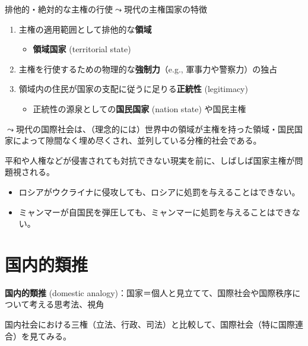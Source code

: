 \documentclass[
  xelatex,
  ja=standard]{bxjsarticle}
\providecommand{\tightlist}{%
  \setlength{\itemsep}{0pt}\setlength{\parskip}{0pt}}\usepackage{longtable,booktabs,array}
\begin{document}
排他的・絶対的な主権の行使\(\leadsto\)現代の主権国家の特徴
\citep{sunahara2020}

\begin{enumerate}
\def\labelenumi{\arabic{enumi}.}
\tightlist
\item
  主権の適用範囲として排他的な\textbf{領域}

  \begin{itemize}
  \tightlist
  \item
    \textbf{領域国家} (territorial state)
  \end{itemize}
\item
  主権を行使するための物理的な\textbf{強制力}（e.g.,
  軍事力や警察力）の独占
\item
  領域内の住民が国家の支配に従うに足りる\textbf{正統性} (legitimacy)

  \begin{itemize}
  \tightlist
  \item
    正統性の源泉としての\textbf{国民国家} (nation state) や国民主権
  \end{itemize}
\end{enumerate}

\(\leadsto\)現代の国際社会は、（理念的には）世界中の領域が主権を持った領域・国民国家によって隙間なく埋め尽くされ、並列している分権的社会である。

平和や人権などが侵害されても対抗できない現実を前に、しばしば国家主権が問題視される。

\begin{itemize}
\tightlist
\item
  ロシアがウクライナに侵攻しても、ロシアに処罰を与えることはできない。
\item
  ミャンマーが自国民を弾圧しても、ミャンマーに処罰を与えることはできない。
\end{itemize}

\hypertarget{ux56fdux5185ux7684ux985eux63a8}{%
\section{国内的類推}\label{ux56fdux5185ux7684ux985eux63a8}}

\textbf{国内的類推} (domestic
analogy)：国家＝個人と見立てて、国際社会や国際秩序について考える思考法、視角\citetext{\citealp[p.174]{nakanishi2013}; \citealp[p.39-46]{shinoda2007}}

国内社会における三権（立法、行政、司法）と比較して、国際社会（特に国際連合）を見てみる。
\end{document}
